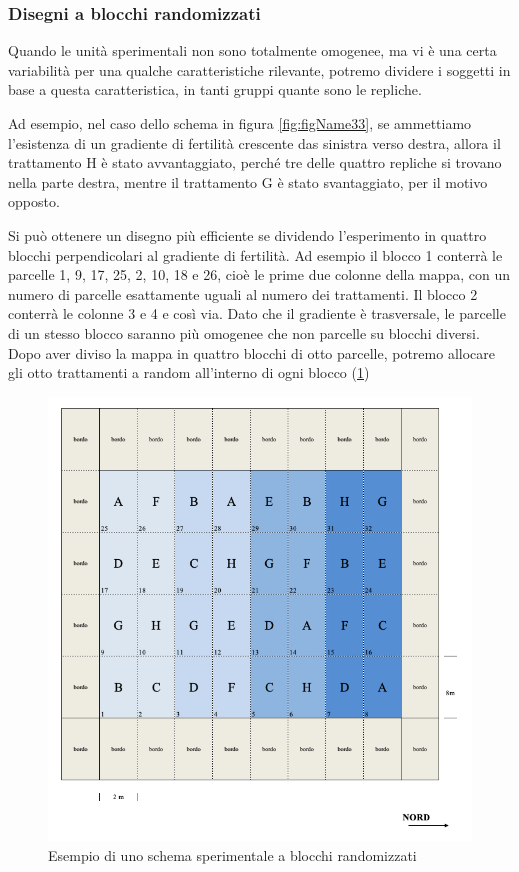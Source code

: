 \documentclass[a4paper,12pt,oneside]{book}
\begin{document}
\hypertarget{disegni-a-blocchi-randomizzati}{%
\subsubsection{Disegni a blocchi randomizzati}\label{disegni-a-blocchi-randomizzati}}

Quando le unità sperimentali non sono totalmente omogenee, ma vi è una certa variabilità per una qualche caratteristiche rilevante, potremo dividere i soggetti in base a questa caratteristica, in tanti gruppi quante sono le repliche.

Ad esempio, nel caso dello schema in figura \ref{fig:figName33}, se ammettiamo l'esistenza di un gradiente di fertilità crescente das sinistra verso destra, allora il trattamento H è stato avvantaggiato, perché tre delle quattro repliche si trovano nella parte destra, mentre il trattamento G è stato svantaggiato, per il motivo opposto.

Si può ottenere un disegno più efficiente se dividendo l'esperimento in quattro blocchi perpendicolari al gradiente di fertilità. Ad esempio il blocco 1 conterrà le parcelle 1, 9, 17, 25, 2, 10, 18 e 26, cioè le prime due colonne della mappa, con un numero di parcelle esattamente uguali al numero dei trattamenti. Il blocco 2 conterrà le colonne 3 e 4 e così via. Dato che il gradiente è trasversale, le parcelle di un stesso blocco saranno più omogenee che non parcelle su blocchi diversi. Dopo aver diviso la mappa in quattro blocchi di otto parcelle, potremo allocare gli otto trattamenti a random all'interno di ogni blocco (\ref{fig:figName34})

\begin{figure}

{\centering \includegraphics[width=0.9\linewidth]{_images/Mappa1CRBD} 

}

\caption{Esempio di uno schema sperimentale a blocchi randomizzati}\label{fig:figName34}
\end{figure}
\end{document}
